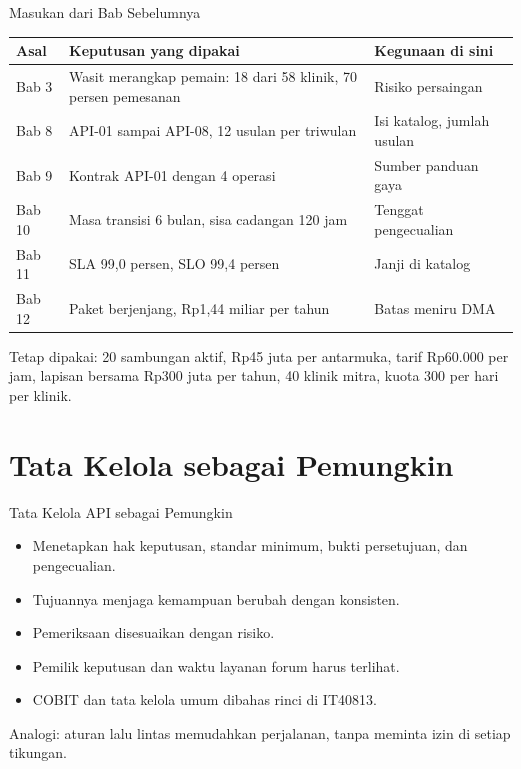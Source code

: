 \documentclass[aspectratio=169, table, 12pt]{beamer}
\begin{document}
\begin{frame}{{\Large Masukan dari Bab Sebelumnya}}
  \footnotesize
  \begin{tabularx}{\textwidth}{>{\raggedright\arraybackslash}p{1.3cm} >{\raggedright\arraybackslash}X >{\raggedright\arraybackslash}p{4.3cm}}
    \hline
    \textbf{Asal} & \textbf{Keputusan yang dipakai} & \textbf{Kegunaan di sini} \\ \hline
    Bab 3 & Wasit merangkap pemain: 18 dari 58 klinik, 70 persen pemesanan & Risiko persaingan \\ \hline
    Bab 8 & API-01 sampai API-08, 12 usulan per triwulan & Isi katalog, jumlah usulan \\ \hline
    Bab 9 & Kontrak API-01 dengan 4 operasi & Sumber panduan gaya \\ \hline
    Bab 10 & Masa transisi 6 bulan, sisa cadangan 120 jam & Tenggat pengecualian \\ \hline
    Bab 11 & SLA 99,0 persen, SLO 99,4 persen & Janji di katalog \\ \hline
    Bab 12 & Paket berjenjang, Rp1,44 miliar per tahun & Batas meniru DMA \\ \hline
  \end{tabularx}

  \vspace{8pt}
  \small Tetap dipakai: 20 sambungan aktif, Rp45 juta per antarmuka, tarif Rp60.000 per jam, lapisan bersama Rp300 juta per tahun, 40 klinik mitra, kuota 300 per hari per klinik.
\end{frame}

\section{Tata Kelola sebagai Pemungkin}

\begin{frame}{{\Large Tata Kelola API sebagai Pemungkin}}
  \vspace{8pt}
  \begin{itemize}
    \item Menetapkan hak keputusan, standar minimum, bukti persetujuan, dan pengecualian.
    \item Tujuannya menjaga kemampuan berubah dengan konsisten.
    \item Pemeriksaan disesuaikan dengan risiko.
    \item Pemilik keputusan dan waktu layanan forum harus terlihat.
    \item COBIT dan tata kelola umum dibahas rinci di IT40813.
  \end{itemize}
  \vspace{6pt}
  {\small Analogi: aturan lalu lintas memudahkan perjalanan, tanpa meminta izin di setiap tikungan.}
\end{frame}
\end{document}
